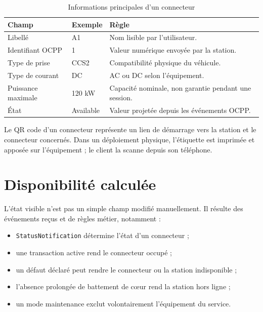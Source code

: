 \begin{table}[H]
  \centering
  \caption{Informations principales d'un connecteur}
  \label{tab:connector-fields}
  \begin{tabularx}{\textwidth}{|L{3.5cm}|Y|Y|}
    \hline
    \textbf{Champ} & \textbf{Exemple} & \textbf{Règle} \\ \hline
    Libellé & A1 & Nom lisible par l'utilisateur. \\ \hline
    Identifiant OCPP & 1 & Valeur numérique envoyée par la station. \\ \hline
    Type de prise & CCS2 & Compatibilité physique du véhicule. \\ \hline
    Type de courant & DC & AC ou DC selon l'équipement. \\ \hline
    Puissance maximale & 120 kW & Capacité nominale, non garantie pendant une
    session. \\ \hline
    État & Available & Valeur projetée depuis les événements OCPP. \\ \hline
  \end{tabularx}
\end{table}

Le QR code d'un connecteur représente un lien de démarrage vers la station et
le connecteur concernés. Dans un déploiement physique, l'étiquette est imprimée
et apposée sur l'équipement ; le client la scanne depuis son téléphone.

\section{Disponibilité calculée}

L'état visible n'est pas un simple champ modifié manuellement. Il résulte des
événements reçus et de règles métier, notamment :

\begin{itemize}[leftmargin=*]
  \item \texttt{StatusNotification} détermine l'état d'un connecteur ;
  \item une transaction active rend le connecteur occupé ;
  \item un défaut déclaré peut rendre le connecteur ou la station indisponible ;
  \item l'absence prolongée de battement de cœur rend la station hors ligne ;
  \item un mode maintenance exclut volontairement l'équipement du service.
\end{itemize}

